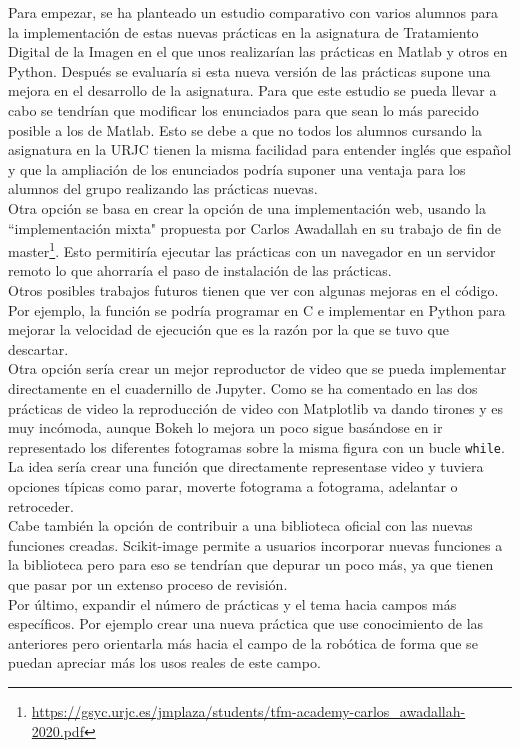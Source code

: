 Para empezar, se ha planteado un estudio comparativo con varios alumnos para la implementación de estas nuevas prácticas en la asignatura de Tratamiento Digital de la Imagen  en el que unos realizarían las prácticas en Matlab y otros en Python. Después se evaluaría si esta nueva versión de las prácticas supone una mejora en el desarrollo de la asignatura. Para que este estudio se pueda llevar a cabo se tendrían que modificar los enunciados para que sean lo más parecido posible a los de Matlab. Esto se debe a que no todos los alumnos cursando la asignatura en la URJC tienen la misma facilidad para entender inglés que español y que la ampliación de los enunciados podría suponer una ventaja para los alumnos del grupo realizando las prácticas nuevas.\\

Otra opción se basa en crear la opción de una implementación web, usando la ``implementación mixta" propuesta por Carlos Awadallah en su trabajo de fin de master\footnote{\url{https://gsyc.urjc.es/jmplaza/students/tfm-academy-carlos_awadallah-2020.pdf}}. Esto permitiría ejecutar las prácticas con un navegador en un servidor remoto lo que ahorraría el paso de instalación de las prácticas.\\

Otros posibles trabajos futuros tienen que ver con algunas mejoras en el código. Por ejemplo, la función  se podría programar en C e implementar en Python para mejorar la velocidad de ejecución que es la razón por la que se tuvo que descartar.\\

Otra opción sería crear un mejor reproductor de video que se pueda implementar directamente en el cuadernillo de Jupyter. Como se ha comentado en las dos prácticas de video la reproducción de video con Matplotlib va dando tirones y es muy incómoda, aunque Bokeh lo mejora un poco sigue basándose en ir representado los diferentes fotogramas sobre la misma figura con un bucle \texttt{while}. La idea sería crear una función que directamente representase video y tuviera opciones típicas como parar, moverte fotograma a fotograma, adelantar o retroceder.\\

Cabe también la opción de contribuir a una biblioteca oficial con las nuevas funciones creadas. Scikit-image permite a usuarios incorporar nuevas funciones a la biblioteca pero para eso se tendrían que depurar un poco más, ya que tienen que pasar por un extenso proceso de revisión.\\

Por último, expandir el número de prácticas y el tema hacia campos más específicos. Por ejemplo crear una nueva práctica que use conocimiento de las anteriores pero orientarla más hacia el campo de la robótica de forma que se puedan apreciar más los usos reales de este campo.\\